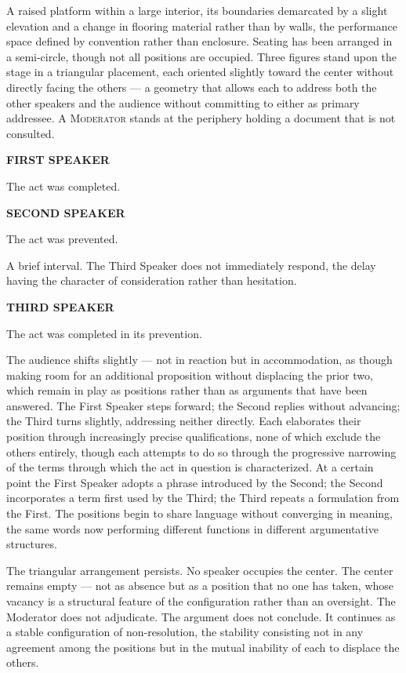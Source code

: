 \documentclass[12pt, oneside]{article}
\newcommand{\sceneheading}[1]{%
  \vspace{1.8em}%
  \noindent{\bfseries\large\MakeUppercase{#1}}%
  \vspace{0.6em}%
  \par\noindent{\color{rulecolor}\rule{\linewidth}{0.3pt}}%
  \vspace{0.5em}\par%
}
\newenvironment{action}{%
  \vspace{0.6em}%
  \noindent\ignorespaces%
}{%
  \par\vspace{0.6em}%
}
\newcommand{\character}[1]{%
  \vspace{0.8em}%
  \begin{center}%
    \bfseries\MakeUppercase{#1}%
  \end{center}%
  \vspace{-0.3em}%
}
\newenvironment{dialogue}{%
  \vspace{0.2em}%
  \begin{list}{}{%
    \setlength{\leftmargin}{1.2in}%
    \setlength{\rightmargin}{0.8in}%
    \setlength{\itemsep}{0.6em}%
    \setlength{\parsep}{0pt}%
  }%
}{%
  \end{list}%
  \vspace{0.4em}%
}
\newcommand{\says}[2]{%
  \character{#1}%
  \begin{dialogue}\item #2\end{dialogue}%
}
\begin{document}
\sceneheading{INT. Temporary Stage — Evening}

\begin{action}
A raised platform within a large interior, its boundaries demarcated by a slight elevation and a change in flooring material rather than by walls, the performance space defined by convention rather than enclosure. Seating has been arranged in a semi-circle, though not all positions are occupied. Three figures stand upon the stage in a triangular placement, each oriented slightly toward the center without directly facing the others --- a geometry that allows each to address both the other speakers and the audience without committing to either as primary addressee. A \textsc{Moderator} stands at the periphery holding a document that is not consulted.
\end{action}

\says{First Speaker}{The act was completed.}

\says{Second Speaker}{The act was prevented.}

\begin{action}
A brief interval. The Third Speaker does not immediately respond, the delay having the character of consideration rather than hesitation.
\end{action}

\says{Third Speaker}{The act was completed in its prevention.}

\begin{action}
The audience shifts slightly --- not in reaction but in accommodation, as though making room for an additional proposition without displacing the prior two, which remain in play as positions rather than as arguments that have been answered. The First Speaker steps forward; the Second replies without advancing; the Third turns slightly, addressing neither directly. Each elaborates their position through increasingly precise qualifications, none of which exclude the others entirely, though each attempts to do so through the progressive narrowing of the terms through which the act in question is characterized. At a certain point the First Speaker adopts a phrase introduced by the Second; the Second incorporates a term first used by the Third; the Third repeats a formulation from the First. The positions begin to share language without converging in meaning, the same words now performing different functions in different argumentative structures.

The triangular arrangement persists. No speaker occupies the center. The center remains empty --- not as absence but as a position that no one has taken, whose vacancy is a structural feature of the configuration rather than an oversight. The Moderator does not adjudicate. The argument does not conclude. It continues as a stable configuration of non-resolution, the stability consisting not in any agreement among the positions but in the mutual inability of each to displace the others.
\end{action}
\end{document}

